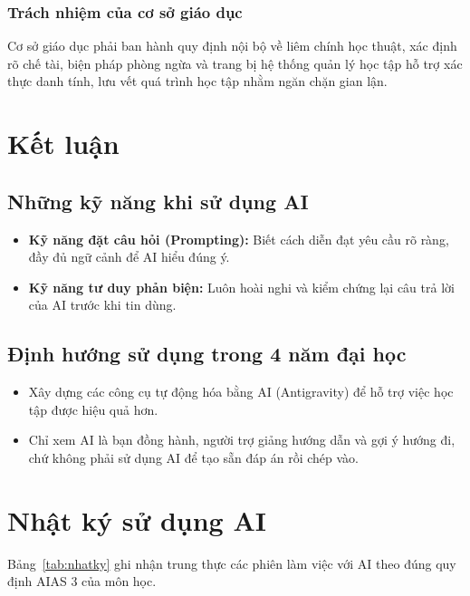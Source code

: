 \documentclass[12pt,a4paper]{article}
\begin{document}
\subsubsection{Trách nhiệm của cơ sở giáo dục}
Cơ sở giáo dục phải ban hành quy định nội bộ về liêm chính học thuật, xác định rõ chế tài, biện pháp phòng ngừa và trang bị hệ thống quản lý học tập hỗ trợ xác thực danh tính, lưu vết quá trình học tập nhằm ngăn chặn gian lận.

\section{Kết luận}

\subsection{Những kỹ năng khi sử dụng AI}
\begin{itemize}
  \item \textbf{Kỹ năng đặt câu hỏi (Prompting):} Biết cách diễn đạt yêu cầu rõ ràng, đầy đủ ngữ cảnh để AI hiểu đúng ý.
  \item \textbf{Kỹ năng tư duy phản biện:} Luôn hoài nghi và kiểm chứng lại câu trả lời của AI trước khi tin dùng.
\end{itemize}

\subsection{Định hướng sử dụng trong 4 năm đại học}
\begin{itemize}
  \item Xây dựng các công cụ tự động hóa bằng AI (Antigravity) để hỗ trợ việc học tập được hiệu quả hơn.
  \item Chỉ xem AI là bạn đồng hành, người trợ giảng hướng dẫn và gợi ý hướng đi, chứ không phải sử dụng AI để tạo sẵn đáp án rồi chép vào.
\end{itemize}




\newpage
\appendix
\section{Nhật ký sử dụng AI}
Bảng~\ref{tab:nhatky} ghi nhận trung thực các phiên làm việc với AI theo đúng quy định AIAS 3 của môn học.
\end{document}
